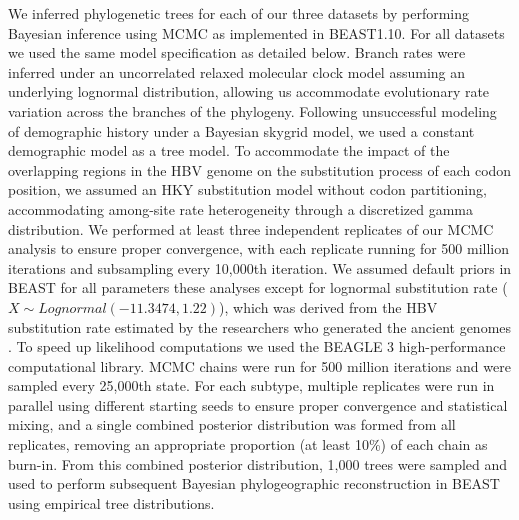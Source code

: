 We inferred phylogenetic trees for each of our three datasets by performing Bayesian inference using MCMC as implemented in BEAST1.10. %
For all datasets we used the same model specification as detailed below.
Branch rates were inferred under an uncorrelated relaxed molecular clock model assuming an underlying lognormal distribution, allowing us accommodate evolutionary rate variation across the branches of the phylogeny.
Following unsuccessful modeling of demographic history under a Bayesian skygrid model, we used a constant demographic model as a tree model. %
To accommodate the impact of the overlapping regions in the HBV genome on the substitution process of each codon position, we assumed an HKY substitution model without codon partitioning, accommodating among-site rate heterogeneity through a discretized gamma distribution. %
We performed at least three independent replicates of our MCMC analysis to ensure proper convergence, with each replicate running for 500 million iterations and subsampling every 10,000th iteration. %
We assumed default priors in BEAST for all parameters these analyses except for lognormal substitution rate ($X \sim Lognormal(-11.3474,1.22)$), %
which was derived from the HBV substitution rate estimated by the researchers who generated the ancient genomes \cite{muhlemann}.
To speed up likelihood computations we used the BEAGLE 3 high-performance computational library.
MCMC chains were run for 500 million iterations and were sampled every 25,000th state.
For each subtype, multiple replicates were run in parallel using different starting seeds to ensure proper convergence and statistical mixing, and a single combined posterior distribution was formed from all replicates, removing an appropriate proportion (at least 10\%) of each chain as burn-in.
From this combined posterior distribution, 1,000 trees were sampled and used to perform subsequent Bayesian phylogeographic reconstruction in BEAST using empirical tree distributions. %

